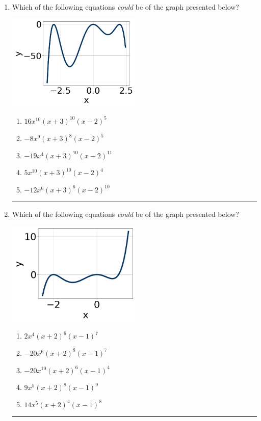 \documentclass[14pt]{extbook}
\newcommand{\litem}[1]{\item#1\hspace*{-1cm}\rule{\textwidth}{0.4pt}}
\begin{document}
\begin{enumerate}
\litem{
Which of the following equations \textit{could} be of the graph presented below?
\begin{center}
    \includegraphics[width=0.5\textwidth]{../Figures/polyGraphToFunctionCopyC.png}
\end{center}
\begin{enumerate}[label=\Alph*.]
\item \( 16x^{10} (x + 3)^{10} (x - 2)^{5} \)
\item \( -8x^{9} (x + 3)^{8} (x - 2)^{5} \)
\item \( -19x^{4} (x + 3)^{10} (x - 2)^{11} \)
\item \( 5x^{10} (x + 3)^{10} (x - 2)^{4} \)
\item \( -12x^{6} (x + 3)^{6} (x - 2)^{10} \)

\end{enumerate} }
\litem{
Which of the following equations \textit{could} be of the graph presented below?
\begin{center}
    \includegraphics[width=0.5\textwidth]{../Figures/polyGraphToFunctionC.png}
\end{center}
\begin{enumerate}[label=\Alph*.]
\item \( 2x^{4} (x + 2)^{6} (x - 1)^{7} \)
\item \( -20x^{6} (x + 2)^{8} (x - 1)^{7} \)
\item \( -20x^{10} (x + 2)^{6} (x - 1)^{4} \)
\item \( 9x^{5} (x + 2)^{8} (x - 1)^{9} \)
\item \( 14x^{5} (x + 2)^{4} (x - 1)^{8} \)


\end{enumerate}}
\end{enumerate}
\end{document}

